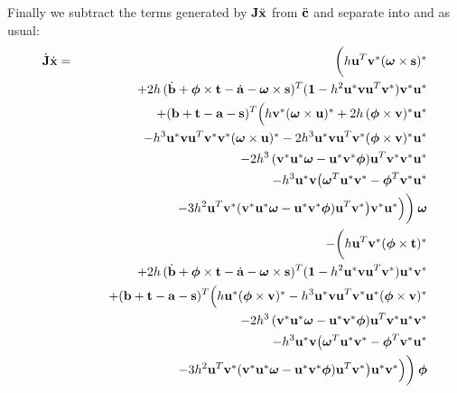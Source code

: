 Finally we subtract the terms generated by $\m{J}\ddot{\ve{x}}$ from $\ddot{\ve{c}}$ and separate
into \ve{\omega} and \ve{\lambda} as usual:
\begin{eqnarray}
\dot{\m{J}}\dot{\ve{x}} &=& \bigg(
        h\ve{u}^T\dual{\ve{v}}\dual{(\ve{\omega}\times\ve{s})} \\*&&\quad\quad +
        2h\,(\dot{\ve{b}} + \ve{\phi}\times\ve{t} - \dot{\ve{a}} - \ve{\omega}\times\ve{s})^T
        (\m{1} - h^2\dual{\ve{u}}\ve{v}\ve{u}^T\dual{\ve{v}}) \dual{\ve{v}}\dual{\ve{u}}
        \nonumber\\*&&\quad\quad
        +(\ve{b} + \ve{t} - \ve{a} - \ve{s})^T \Big(
        h\dual{\ve{v}}\dual{(\ve{\omega}\times\ve{u})}
        +2h\,\dual{(\ve{\phi}\times\ve{v})}\dual{\ve{u}} \nonumber\\*&&\quad\quad\quad\quad
        -h^3\dual{\ve{u}}\ve{v}\ve{u}^T\dual{\ve{v}}\dual{\ve{v}}\dual{(\ve{\omega}\times\ve{u})}
        -2h^3\dual{\ve{u}}\ve{v}\ve{u}^T\dual{\ve{v}}\dual{(\ve{\phi}\times\ve{v})}\dual{\ve{u}}
        \nonumber\\*&&\quad\quad\quad\quad
        -2h^3\,(\dual{\ve{v}}\dual{\ve{u}}\ve{\omega} - \dual{\ve{u}}\dual{\ve{v}}\ve{\phi})
        \ve{u}^T\dual{\ve{v}}\dual{\ve{v}}\dual{\ve{u}}
        \nonumber\\*&&\quad\quad\quad\quad
        -h^3 \dual{\ve{u}}\ve{v} \big(
        \ve{\omega}^T\dual{\ve{u}}\dual{\ve{v}} - \ve{\phi}^T\dual{\ve{v}}\dual{\ve{u}}
        \nonumber\\*&&\quad\quad\quad\quad\quad\quad
        -3h^2 \ve{u}^T\dual{\ve{v}}
        (\dual{\ve{v}}\dual{\ve{u}}\ve{\omega} - \dual{\ve{u}}\dual{\ve{v}}\ve{\phi})
        \ve{u}^T\dual{\ve{v}} \big) \dual{\ve{v}}\dual{\ve{u}} \Big) \bigg)\: \ve{\omega}
        \nonumber\\*&&
        -\bigg(
        h\ve{u}^T\dual{\ve{v}}\dual{(\ve{\phi}\times\ve{t})} \nonumber\\*&&\quad\quad
        +2h\,(\dot{\ve{b}} + \ve{\phi}\times\ve{t} - \dot{\ve{a}} - \ve{\omega}\times\ve{s})^T
        (\m{1} - h^2\dual{\ve{u}}\ve{v}\ve{u}^T\dual{\ve{v}}) \dual{\ve{u}}\dual{\ve{v}}
        \nonumber\\*&&\quad\quad
        +(\ve{b} + \ve{t} - \ve{a} - \ve{s})^T \Big(
        h\dual{\ve{u}}\dual{(\ve{\phi}\times\ve{v})}
        -h^3\dual{\ve{u}}\ve{v}\ve{u}^T\dual{\ve{v}}\dual{\ve{u}}\dual{(\ve{\phi}\times\ve{v})}
        \nonumber\\*&&\quad\quad\quad\quad
        -2h^3\,(\dual{\ve{v}}\dual{\ve{u}}\ve{\omega} - \dual{\ve{u}}\dual{\ve{v}}\ve{\phi})
        \ve{u}^T\dual{\ve{v}} \dual{\ve{u}}\dual{\ve{v}}
        \nonumber\\*&&\quad\quad\quad\quad
        -h^3 \dual{\ve{u}}\ve{v} \big(
        \ve{\omega}^T\dual{\ve{u}}\dual{\ve{v}} - \ve{\phi}^T\dual{\ve{v}}\dual{\ve{u}}
        \nonumber\\*&&\quad\quad\quad\quad\quad\quad
        -3h^2 \ve{u}^T\dual{\ve{v}}
        (\dual{\ve{v}}\dual{\ve{u}}\ve{\omega} - \dual{\ve{u}}\dual{\ve{v}}\ve{\phi})
        \ve{u}^T\dual{\ve{v}}
        \big) \dual{\ve{u}}\dual{\ve{v}} \Big) \bigg)\: \ve{\phi} \nonumber
\end{eqnarray}
